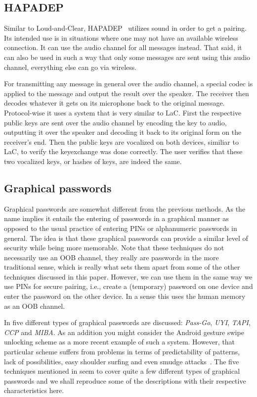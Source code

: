 \documentclass[conference, 11pt]{sty/IEEEtran}
\begin{document}
\subsection{HAPADEP}
\label{ssec:hapadep}

Similar to Loud-and-Clear, HAPADEP~\cite{soriente2008hapadep} utilizes sound in order to get a pairing.
Its intended use is in situations where one may not have an available wireless connection.
It can use the audio channel for all messages instead.
That said, it can also be used in such a way that only some messages are sent using this audio channel, everything else can go via wireless.

For transmitting any message in general over the audio channel, a special codec is applied to the message and output the result over the speaker.
The receiver then decodes whatever it gets on its microphone back to the original message.
Protocol-wise it uses a system that is very similar to LaC.
First the respective public keys are sent over the audio channel by encoding the key to audio, outputting it over the speaker and decoding it back to its original form on the receiver's end.
Then the public keys are vocalized on both devices, similiar to LaC, to verify the keyexchange was done correctly.
The user verifies that these two vocalized keys, or hashes of keys, are indeed the same.

\subsection{Graphical passwords}
\label{ssec:graphical_passwords}

Graphical passwords are somewhat different from the previous methods.
As the name implies it entails the entering of passwords in a graphical manner as opposed to the usual practice of entering PINs or alphanumeric passwords in general.
The idea is that these graphical passwords can provide a similar level of security while being more memorable.
Note that these techniques do not necessarily use an OOB channel, they really are passwords in the more traditional sense, which is really what sets them apart from some of the other techniques discussed in this paper.
However, we can use them in the same way we use PINs for secure pairing, i.e., create a (temporary) password on one device and enter the password on the other device.
In a sense this uses the human memory as an OOB channel.

In \cite{schaub2013exploring} five different types of graphical passwords are discussed: \emph{Pass-Go}, \emph{UYI}, \emph{TAPI}, \emph{CCP} and \emph{MIBA}.
As an addition you might consider the Android gesture swipe unlocking scheme as a more recent example of such a system.
However, that particular scheme suffers from problems in terms of predictability of patterns, lack of possibilities, easy shoulder surfing and even smudge attacks~\cite{aviv2010smudge}.
The five techniques mentioned in \cite{schaub2013exploring} seem to cover quite a few different types of graphical passwords and we shall reproduce some of the descriptions with their respective characteristics here.
\end{document}
